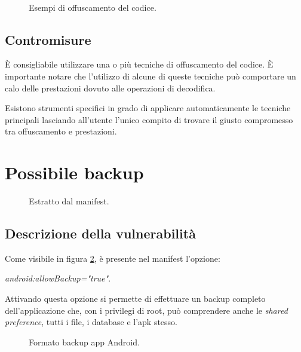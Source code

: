 \begin{figure}[h]
	\centering
	 \\
	\caption{Esempi di offuscamento del codice.}
	\label{fig:obfuscation}
\end{figure}

\subsection{Contromisure}
È consigliabile utilizzare una o più tecniche di offuscamento del codice. È importante notare che l'utilizzo di alcune di queste tecniche può comportare un calo delle prestazioni dovuto alle operazioni di decodifica.

Esistono strumenti specifici in grado di applicare automaticamente le tecniche principali lasciando all'utente l'unico compito di trovare il giusto compromesso tra offuscamento e prestazioni.

\section{Possibile backup}

\begin{figure}[h]
	\centering 
	\caption{Estratto dal manifest.}
	\label{fig:backup}
\end{figure}

\subsection{Descrizione della vulnerabilità}

Come visibile in figura \ref{fig:backup}, è presente nel manifest l'opzione:
\begin{center}
	\emph{android:allowBackup="true"}.
\end{center}

Attivando questa opzione si permette di effettuare un backup completo dell'applicazione che, con i privilegi di root, può comprendere anche le \emph{shared preference}, tutti i file, i database e l'apk stesso.
\begin{figure}[h]
	\centering 
	\caption{Formato backup app Android.}
	\label{fig:structure}
\end{figure}


